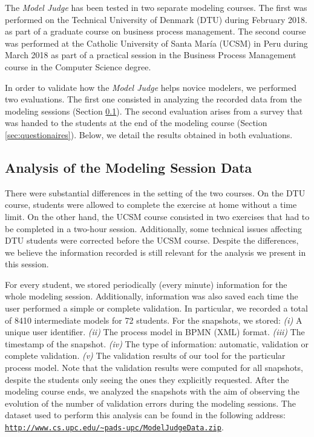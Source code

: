 
The \textit{Model Judge} has been tested in two separate modeling courses. The first was performed on the Technical University of Denmark (DTU) during February 2018. as part of a graduate course on business process management. 
The second course was performed at the Catholic University of Santa Mar\'ia (UCSM) in Peru during March 2018 as part of a practical session in the Business Process Management course in the Computer Science degree.

In order to validate how the \textit{Model Judge} helps novice modelers, we performed two evaluations.  The first one consisted in analyzing the recorded data from the modeling sessions (Section \ref{sec:data_analysis}). The second evaluation arises from a survey that was handed to the students at the end of the modeling course (Section \ref{sec:questionaires}). Below, we detail the results obtained in both evaluations.

\subsection{Analysis of the Modeling Session Data}
\label{sec:data_analysis}
There were substantial differences in the setting of the two courses. On the DTU course, students were allowed to complete the exercise at home without a time limit. On the other hand, the UCSM course consisted in two exercises that had to be completed in a two-hour session.
Additionally, some technical issues affecting DTU students were corrected before the UCSM course. Despite the differences, we believe the information recorded is still relevant for the analysis we present in this session. 

For every student, we stored periodically (every minute) information for the whole modeling session. Additionally, information was also saved each time the user performed a simple or complete validation. In particular, we recorded a total of 8410 intermediate models for 72 students. For the snapshots, we stored: \textit{(i)} A unique user identifier. \textit{(ii)} The process model in BPMN (XML) format. \textit{(iii)} The timestamp of the snapshot. \textit{(iv)} The type of information: automatic, validation or complete validation. \textit{(v)} The validation results of our tool for the particular process model. Note that the validation results were computed for all snapshots, despite the students only seeing the ones they explicitly requested. 
After the modeling course ends, we analyzed the snapshots with the aim of observing the evolution of the number of validation errors during the modeling sessions. The dataset used to perform this analysis can be found in the following address: \texttt{\url{http://www.cs.upc.edu/~pads-upc/ModelJudgeData.zip}}.

